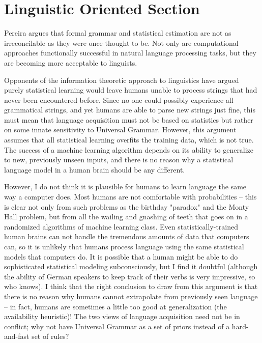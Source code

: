 \documentclass[paper=a4, fontsize=11pt]{scrartcl} %
\begin{document}
\section{Linguistic Oriented Section}

Pereira argues that formal grammar and statistical estimation are not as irreconcilable as they were once thought to be.  Not only are computational approaches functionally successful in natural language processing tasks, but they are becoming more acceptable to linguists.

Opponents of the information theoretic approach to linguistics have argued purely statistical learning would leave humans unable to process strings that had never been encountered before.  Since no one could possibly experience all grammatical strings, and yet humans are able to parse new strings just fine, this must mean that language acquisition must not be based on statistics but rather on some innate sensitivity to Universal Grammar.  However, this argument assumes that all statistical learning overfits the training data, which is not true.  The success of a machine learning algorithm depends on its ability to generalize to new, previously unseen inputs, and there is no reason why a statistical language model in a human brain should be any different.  

However, I do not think it is plausible for humans to learn language the same way a computer does.  Most humans are not comfortable with probabilities -- this is clear not only from such problems as the birthday "paradox" and the Monty Hall problem, but from all the wailing and gnashing of teeth that goes on in a randomized algorithms of machine learning class.  Even statistically-trained human brains can not handle the tremendous amounts of data that computers can, so it is unlikely that humans process language using the same statistical models that computers do.  It is possible that a human might be able to do sophisticated statistical modeling subconsciously, but I find it doubtful (although the ability of German speakers to keep track of their verbs is very impressive, so who knows).  I think that the right conclusion to draw from this argument is that there is no reason why humans cannot extrapolate from previously seen language -- in fact, humans are sometimes a little too good at generalization (the availability heuristic)!  The two views of language acquisition need not be in conflict; why not have Universal Grammar as a set of priors instead of a hard-and-fast set of rules?
\end{document}
